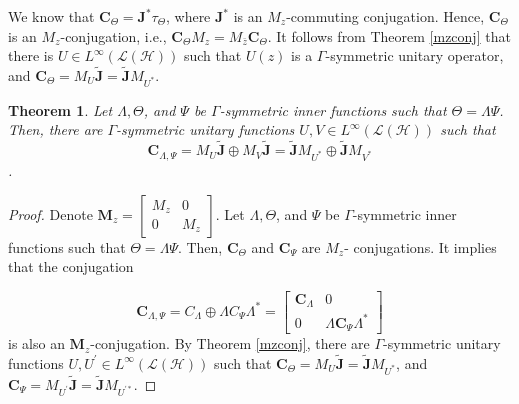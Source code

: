 \documentclass[12pt]{amsart}
\numberwithin{equation}{section}
\newcommand{\hsp}{\mathcal{H}}
\newcommand{\oL }{\mathcal{L}(\hsp) }
\newcommand{\C}{{\mathbf{C}}}
\newcommand{\M}{{\mathbf{M}}}
\newcommand{\J}{{\mathbf{J}}}
\newtheorem{theorem}{Theorem}[section]
\theoremstyle{definition}
\numberwithin{equation}{section}
\begin{document}
 We know that $\C_{\Theta}=\J^*\tau_\Theta$, where $\J^*$ is an $M_{z}$-commuting conjugation. Hence, $\C_{\Theta}$ is an $M_{z}$-conjugation, i.e., $\C_{\Theta}M_{z}=M_{\bar z}\C_{\Theta}$. It follows from Theorem \ref{mzconj} that there is $U\in L^{\infty}(\oL)$ such that $U(z)$ is a $\Gamma$-symmetric unitary operator, and $\C_{\Theta}=M_{U}\widetilde{\J}=\widetilde{\J}M_{U^{*}}$.

\begin{theorem}
Let $\Lambda,\Theta$, and $\Psi$ be $\Gamma$-symmetric inner functions such that $\Theta=\Lambda\Psi$. Then, there are $\Gamma$-symmetric unitary functions $U, V\in L^{\infty}(\oL)$ such that $$\C_{\Lambda,\Psi}=M_{U}\widetilde{\J}\oplus M_{V}\widetilde{\J}=\widetilde{\J}M_{U^{*}}\oplus \widetilde{\J}M_{V^{*}}$$.
\end{theorem}
\begin{proof}
Denote $\M_{z}=\begin{bmatrix}
M_{z}&0\\
0&M_{z}
\end{bmatrix}
$.
Let $\Lambda, \Theta$, and $\Psi$ be $\Gamma$-symmetric inner functions such that $\Theta=\Lambda\Psi$. Then,
 $\C_{\Theta}$ and $\C_{\Psi}$ are $M_{z}$- conjugations. It implies that the conjugation

 $$\C_{\Lambda,\Psi}=C_{\Lambda}\oplus \Lambda C_{\Psi}\Lambda^{*}=\begin{bmatrix}
\C_{\Lambda}&0\\
0&\Lambda \C_{\Psi}\Lambda^{*}
\end{bmatrix}$$
 is also an $\M_{z}$-conjugation. By Theorem \ref{mzconj}, there are $\Gamma$-symmetric unitary functions $U, U^{\prime}\in L^{\infty}(\oL)$ such that $\C_{\Theta}=M_{U}\widetilde{\J}=\widetilde{\J}M_{U^{*}}$, and $\C_{\Psi}=M_{U^{\prime}}\widetilde{\J}=\widetilde{\J}M_{U^{\prime*}}$.


\end{proof}
\end{document}
